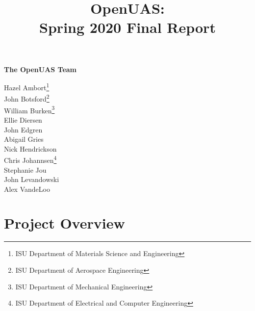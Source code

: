 \documentclass{article}
\title{OpenUAS:\\Spring 2020 Final Report }
\author{ }
\begin{document}
\maketitle

\newpage

\begin{center}
\Large \textbf{The OpenUAS Team}

\vspace{1cm}

\large{
Hazel Ambort\footnote[1]{ISU Department of Materials Science and Engineering}\\ John Botsford\footnote[2]{ISU Department of Aerospace Engineering}\\ William Burken\footnote[3]{ISU Department of Mechanical Engineering}\\ Ellie Diersen\footnotemark[2]\\ John Edgren\footnotemark[2]\\ Abigail Gries\footnotemark[2]\\ Nick Hendrickson\footnotemark[2]\\ Chris Johannsen\footnote[4]{ISU Department of Electrical and Computer Engineering}\\ Stephanie Jou\footnotemark[2]\\ John Levandowski\footnotemark[2]\\ Alex VandeLoo\footnotemark[2] \footnotemark[4]\\
}\par

\end{center}

\newpage


\tableofcontents

\section{Project Overview}
\end{document}
